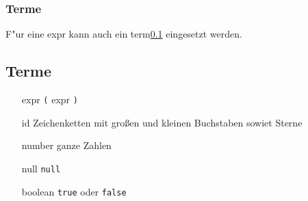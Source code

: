 \documentclass{article}
\begin{document}
\subsubsection{Terme}
F"ur eine expr kann auch ein term{\tiny\ref{term}} eingesetzt werden.

\subsection{Terme} \label{term}
\begin{itemize}
\item[expr]{\texttt{(} expr \texttt{)}}
\item[id]{Zeichenketten mit großen und kleinen Buchstaben sowiet Sterne }
\item[number]{ganze Zahlen }
\item[null]{\texttt{null} }
\item[boolean]{\texttt{true} oder \texttt{false} }
\end{itemize}


\newpage
\end{document}
